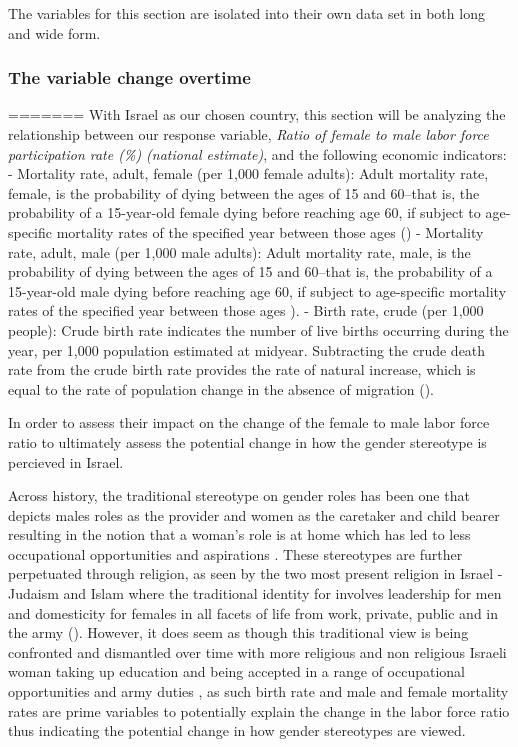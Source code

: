 \documentclass[11pt,a4paper,]{article}
\begin{document}
The variables for this section are isolated into their own data set in
both long and wide form.

\subsubsection{The variable change
overtime}\label{the-variable-change-overtime}
=======
With Israel as our chosen country, this section will be analyzing the relationship between our response variable, \emph{Ratio of female to male labor force participation rate (\%) (national estimate)}, and the following economic indicators:
- Mortality rate, adult, female (per 1,000 female adults): Adult mortality rate, female, is the probability of dying between the ages of 15 and 60--that is, the probability of a 15-year-old female dying before reaching age 60, if subject to age-specific mortality rates of the specified year between those ages (\textcite{TheWorldBank2018})
- Mortality rate, adult, male (per 1,000 male adults): Adult mortality rate, male, is the probability of dying between the ages of 15 and 60--that is, the probability of a 15-year-old male dying before reaching age 60, if subject to age-specific mortality rates of the specified year between those ages \textcite{TheWorldBank2018}).
- Birth rate, crude (per 1,000 people): Crude birth rate indicates the number of live births occurring during the year, per 1,000 population estimated at midyear. Subtracting the crude death rate from the crude birth rate provides the rate of natural increase, which is equal to the rate of population change in the absence of migration (\textcite{TheWorldBank2018}).

In order to assess their impact on the change of the female to male labor force ratio to ultimately assess the potential change in how the gender stereotype is percieved in Israel.

Across history, the traditional stereotype on gender roles has been one that depicts males roles as the provider and women as the caretaker and child bearer resulting in the notion that a woman's role is at home which has led to less occupational opportunities and aspirations \textcite{DickeAL2019}. These stereotypes are further perpetuated through religion, as seen by the two most present religion in Israel - Judaism and Islam where the traditional identity for involves leadership for men and domesticity for females \textcite{Woodhead} in all facets of life from work, private, public and in the army (\textcite{GittlemenSI2020}). However, it does seem as though this traditional view is being confronted and dismantled over time with more religious and non religious Israeli woman taking up education and being accepted in a range of occupational opportunities and army duties \textcite{Levy2006}, as such birth rate and male and female mortality rates are prime variables to potentially explain the change in the labor force ratio thus indicating the potential change in how gender stereotypes are viewed.
\end{document}
